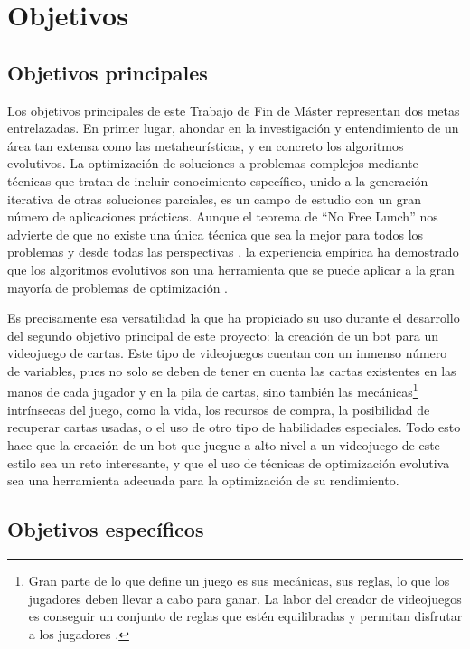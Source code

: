 \chapter{Objetivos} \label{chap:objetivos}


\section{Objetivos principales} \label{sec:objetivo_principal}

Los objetivos principales de este Trabajo de Fin de Máster representan dos metas entrelazadas. En primer lugar, ahondar en la investigación y entendimiento de un área tan extensa como las metaheurísticas, y en concreto los algoritmos evolutivos. La optimización de soluciones a problemas complejos mediante técnicas que tratan de incluir conocimiento específico, unido a la generación iterativa de otras soluciones parciales, es un campo de estudio con un gran número de aplicaciones prácticas. Aunque el teorema de ``No Free Lunch'' nos advierte de que no existe una única técnica que sea la mejor para todos los problemas y desde todas las perspectivas \cite{wolpert_no_1997}, la experiencia empírica ha demostrado que los algoritmos evolutivos son una herramienta que se puede aplicar a la gran mayoría de problemas de optimización \cite{torres-jimenez_applications_2014}.

Es precisamente esa versatilidad la que ha propiciado su uso durante el desarrollo del segundo objetivo principal de este proyecto: la creación de un bot para un videojuego de cartas. Este tipo de videojuegos cuentan con un inmenso número de variables, pues no solo se deben de tener en cuenta las cartas existentes en las manos de cada jugador y en la pila de cartas, sino también las mecánicas\footnote{Gran parte de lo que define un juego es sus mecánicas, sus reglas, lo que los jugadores deben llevar a cabo para ganar. La labor del creador de videojuegos es conseguir un conjunto de reglas que estén equilibradas y permitan disfrutar a los jugadores \cite{wikipedia_diseno_2025}.} intrínsecas del juego, como la vida, los recursos de compra, la posibilidad de recuperar cartas usadas, o el uso de otro tipo de habilidades especiales. Todo esto hace que la creación de un bot que juegue a alto nivel a un videojuego de este estilo sea un reto interesante, y que el uso de técnicas de optimización evolutiva sea una herramienta adecuada para la optimización de su rendimiento.

\section{Objetivos específicos} \label{sec:objetivos_especificos}

